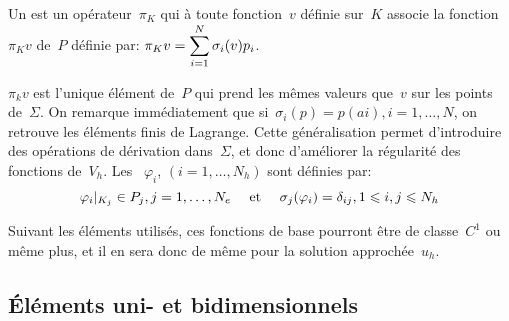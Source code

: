 \medskip
\begin{definition}
Un  est un opérateur~$\pi_K$
qui à toute fonction~$v$ définie sur~$K$ associe la fonction~$\pi_Kv$ de~$P$ définie par:
$\colorred\pi_Kv=\dsum_{i=1}^N \sigma_i(v)p_i$.
\end{definition}
\medskip
$\pi_kv$ est l'unique élément de~$P$ qui prend les mêmes valeurs que~$v$ sur les
points de~$\Sigma$.
\medskip
On remarque immédiatement que si~$\sigma_i(p) = p(ai), i=1,\ldots, N$, on retrouve les éléments finis
de Lagrange.
Cette généralisation permet d'introduire des opérations de dérivation dans~$\Sigma$,
et donc d'améliorer la régularité des fonctions de~$V_h$.
\medskip
Les ~$\varphi_i$, $(i=1,\ldots, N_h)$ sont
définies par:
\begin{equation}
\varphi_i|_{K_j} \in P_j, j=1,\ldots, N_e \quad \text{ et } \quad \colorred
\sigma_j(\varphi_i)=\delta_{ij}, 1\le i,j\le N_h
\end{equation}

Suivant les éléments utilisés, ces fonctions de base pourront être de classe~$C^1$
ou même plus, et il en sera donc de même pour la solution approchée~$u_h$.


\medskip
\subsection{Éléments uni- et bidimensionnels}

